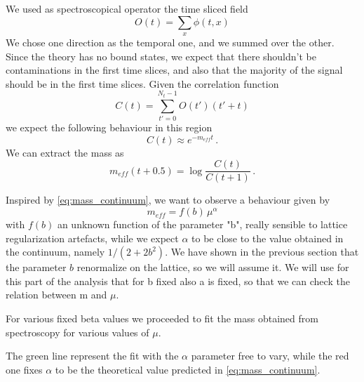 \documentclass[12pt,a4paper]{report}
\begin{document}
We used as spectroscopical operator the time sliced field \begin{equation}
O(t) = \sum_x \phi(t,x)
\end{equation} We chose one direction as the temporal one, and we summed over the other. Since the theory has no bound states, we expect that there shouldn't be contaminations in the first time slices, and also that the majority of the signal should be in the first time slices. Given the correlation function \begin{equation}
C(t) = \sum_{t'=0}^{N_t-1} O(t') (t'+t) 
\end{equation} we expect the following behaviour in this region \begin{equation}
C(t) \approx e^{-m_{eff} t} \,.
\end{equation} We can extract the mass as \begin{equation}
m_{eff}(t+0.5) = \log \dfrac{C(t)}{C(t+1)} \,.
\end{equation}


Inspired by \eqref{eq:mass_continuum}, we want to observe a behaviour given by \begin{equation}
\label{eq:lattice_mass_scaling}
m_{eff}= f(b) \, \mu^\alpha
\end{equation} with $f(b)$  an unknown function of the parameter "b", really sensible to lattice regularization artefacts, while we expect $\alpha$ to be close to the value obtained in the continuum, namely $1/(2+2b^2)$. We have shown in the previous section that the parameter $b$ renormalize on the lattice, so we will assume it. We will use for this part of the analysis that for b fixed also a is fixed, so that we can check the relation between m and $\mu$.

For various fixed beta values we proceeded to fit the mass obtained from spectroscopy for various values of $\mu$.


The green line represent the fit with the $\alpha$ parameter free to vary, while the red one fixes $\alpha$ to be the theoretical value predicted in \eqref{eq:mass_continuum}.
\end{document}
